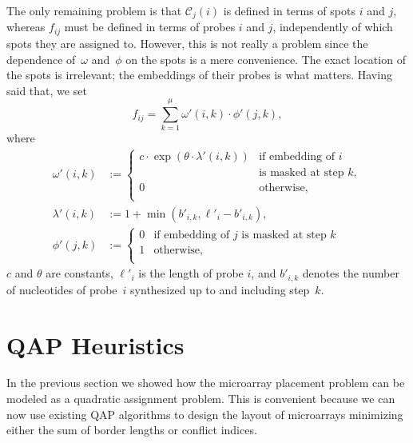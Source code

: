 \documentclass{bioinfo}
\begin{document}
The only remaining problem is that $\mathcal{C}_j(i)$ is defined in terms of spots $i$ and $j$, whereas $f_{ij}$ must be defined in terms of probes $i$ and $j$, independently of which spots they are assigned to. However, this is not really a problem since the dependence of~$\omega$ and~$\phi$ on the spots is a mere convenience. The exact location of the spots is irrelevant; the embeddings of their probes is what matters. Having said that, we set
\begin{equation}
f_{ij} = \sum_{k=1}^{\mu} \omega'(i,k) \cdot \phi'(j,k),
\end{equation}
where
\begin{align}
\omega'(i,k) &:=
        \left\{
                \begin{array}{ll}
                        c \cdot \exp{\left(\theta \cdot \lambda'(i,k)\right)} &
                            \mbox{if embedding of $i$} \\
                          & \mbox{is masked at step $k$}, \\
                        0 & \mbox{otherwise}, \\
                \end{array}
        \right. \\
\lambda'(i,k) &:= 1 + \min(b'_{i,k},\ell'_{i} - b'_{i,k}), \\
\phi'(j,k) &:=
        \left\{
                \begin{array}{ll}
                        0 & \mbox{if embedding of $j$ is masked at step $k$} \\
                        1 & \mbox{otherwise}, \\
                \end{array}
        \right.
\end{align}
$c$ and $\theta$ are constants, $\ell'_i$ is the length of probe $i$, and $b'_{i,k}$ denotes the number of nucleotides of probe~$i$ synthesized up to and including step~$k$.

\section{QAP Heuristics}

In the previous section we showed how the microarray placement problem can be modeled as a quadratic assignment problem. This is convenient because we can now use existing QAP algorithms to design the layout of microarrays minimizing either the sum of border lengths or conflict indices. 
\end{document}
